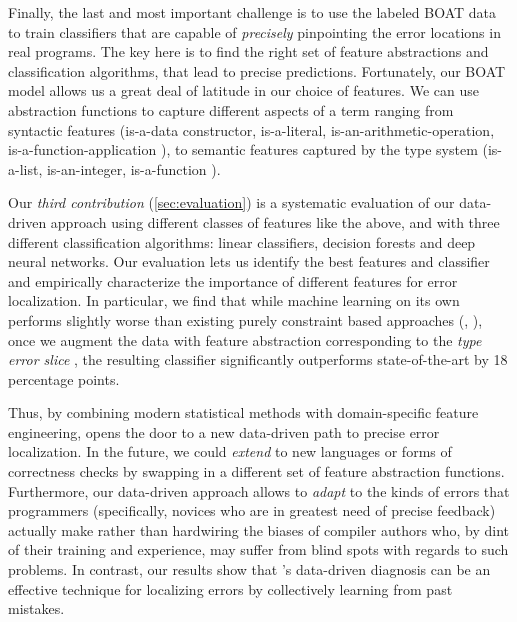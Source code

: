 %
Finally, the last and most important challenge is to
use the labeled BOAT data to train classifiers that
are capable of \emph{precisely} pinpointing the error
locations in real programs.
%
The key here is to find the right set of feature
abstractions and classification algorithms, that
lead to precise predictions.
%
Fortunately, our BOAT model allows us a great deal of
latitude in our choice of features.
%
We can use abstraction functions to capture different
aspects of a term ranging from
%
syntactic features (\eg is-a-data constructor, is-a-literal,
is-an-arithmetic-operation, is-a-function-application \etc),
%
to semantic features captured by the type system (\eg is-a-list,
is-an-integer, is-a-function \etc).

Our \emph{third contribution} (\autoref{sec:evaluation})
is a systematic evaluation of our data-driven approach
using different classes of features like the above, and
with three different classification algorithms: linear
classifiers, decision forests and deep neural networks.
%
Our evaluation lets us identify the best features and
classifier and empirically characterize the importance
of different features for error localization.
%
In particular, we find that while machine learning
on its own performs slightly worse than existing
purely constraint based approaches (\eg \ocaml, \sherrloc),
once we augment the data with feature abstraction
corresponding to the \emph{type error slice} \cite{Tip2001-qp},
the resulting classifier significantly outperforms
state-of-the-art by 18 percentage points.

Thus, by combining modern statistical methods
with domain-specific feature engineering, \toolname
opens the door to a new data-driven path to
precise error localization.
%
In the future, we could \emph{extend}
\toolname to new languages or forms
of correctness checks by swapping in
a different set of feature abstraction
functions.
%
Furthermore, our data-driven approach
allows \toolname to \emph{adapt} to
the kinds of errors that programmers
(specifically, novices who are in greatest
need of precise feedback) actually make
rather than hardwiring the biases of
compiler authors who, by dint of their
training and experience, may suffer from
blind spots with regards to such problems.
%
In contrast, our results show that \toolname's
data-driven diagnosis can be an effective
technique for localizing errors by collectively
learning from past mistakes.

